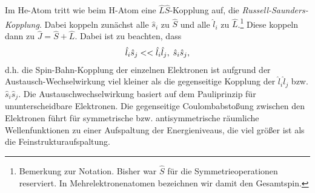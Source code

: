 Im He-Atom tritt wie beim H-Atom eine $\hat{L}\hat{S}$-Kopplung auf, die 
\emph{Russell-Saunders-Kopplung}. Dabei koppeln zunächst alle $\hat{s}_i$ zu
$\hat{S}$ und alle $\hat{l}_i$ zu $\hat{L}$.\footnote{Bemerkung zur Notation.
Bisher war $\hat{S}$ für die Symmetrieoperationen reserviert. In
Mehrelektronenatomen bezeichnen wir damit den Gesamtspin.} Diese koppeln dann
zu $\hat{J}=\hat{S}+\hat{L}$. Dabei ist zu beachten, dass
\begin{align*}
\hat{l}_i \hat{\boldmath{s}}_j << \hat{\boldmath{l}}_i\hat{\boldmath{l}}_j,\; \hat{\boldmath{s}}_i\hat{\boldmath{s}}_j,
\end{align*}
d.h. die Spin-Bahn-Kopplung der einzelnen Elektronen ist aufgrund der
Austausch-Wechselwirkung viel kleiner als die gegenseitige Kopplung
der $\hat{l}_i\hat{l}_j$ bzw. $\hat{s}_i\hat{s}_j$. Die Austauschwechselwirkung
basiert auf dem Pauliprinzip für ununterscheidbare Elektronen. Die gegenseitige
Coulombabstoßung zwischen den Elektronen führt für symmetrische bzw.
antisymmetrische räumliche Wellenfunktionen zu einer Aufspaltung der
Energieniveaus, die viel größer ist als die Feinstrukturaufspaltung.

